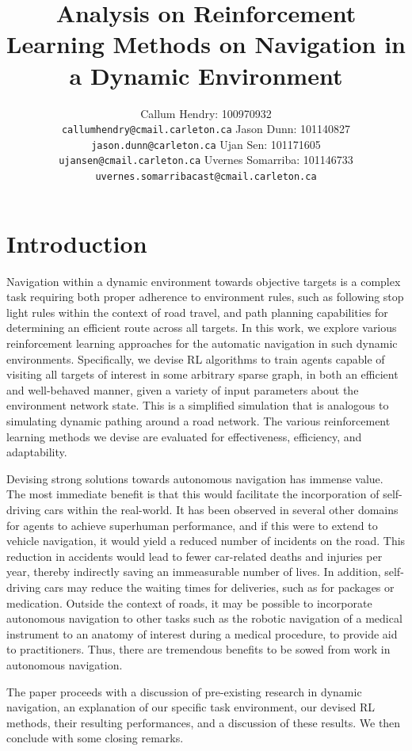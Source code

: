 \documentclass{article}
\title{Analysis on Reinforcement Learning Methods on Navigation in a Dynamic Environment}
\author{
	Callum Hendry: 100970932\\
	\texttt{callumhendry@cmail.carleton.ca}
	\And
	Jason Dunn: 101140827\\
	\texttt{jason.dunn@carleton.ca}
	\And
	Ujan Sen: 101171605\\
	\texttt{ujansen@cmail.carleton.ca}
	\And
	Uvernes Somarriba: 101146733\\
	\texttt{uvernes.somarribacast@cmail.carleton.ca}
}
\begin{document}
	
	
	\maketitle
	
	\section{Introduction}
	Navigation within a dynamic environment towards objective targets is a complex task requiring both proper adherence to environment rules, such as following stop light rules within the context of road travel, and path planning capabilities for determining an efficient route across all targets. In this work, we explore various reinforcement learning approaches for the automatic navigation in such dynamic environments. Specifically, we devise RL algorithms to train agents capable of visiting all targets of interest in some arbitrary sparse graph, in both an efficient and well-behaved manner, given a variety of input parameters about the environment network state. This is a simplified simulation that is analogous to simulating dynamic pathing around a road network. The various reinforcement learning methods we devise are evaluated for effectiveness, efficiency, and adaptability.
	
	Devising strong solutions towards autonomous navigation has immense value. The most immediate benefit is that this would facilitate the incorporation of self-driving cars within the real-world. It has been observed in several other domains for agents to achieve superhuman performance, and if this were to extend to vehicle navigation, it would yield a reduced number of incidents on the road. This reduction in accidents would lead to fewer car-related deaths and injuries per year, thereby indirectly saving an immeasurable number of lives. In addition, self-driving cars may reduce the waiting times for deliveries, such as for packages or medication. Outside the context of roads, it may be possible to incorporate autonomous navigation to other tasks such as the robotic navigation of a medical instrument to an anatomy of interest during a medical procedure, to provide aid to practitioners. Thus, there are tremendous benefits to be sowed from work in autonomous navigation. 
	
	The paper proceeds with a discussion of pre-existing research in dynamic navigation, an explanation of our specific task environment, our devised RL methods, their resulting performances, and a discussion of these results. We then conclude with some closing remarks.
	
\end{document}
